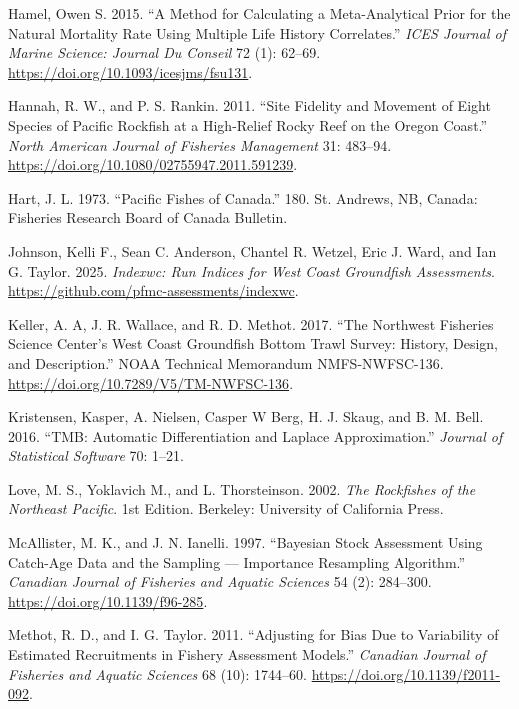 \documentclass[
]{scrartcl}
\newlength{\cslhangindent}
\newenvironment{CSLReferences}[2] %
 {\begin{list}{}{%
  \setlength{\itemindent}{0pt}
  \setlength{\leftmargin}{0pt}
  \setlength{\parsep}{0pt}
  \ifodd #1
   \setlength{\leftmargin}{\cslhangindent}
   \setlength{\itemindent}{-1\cslhangindent}
  \fi
  \setlength{\itemsep}{#2\baselineskip}}}
 {\end{list}}
\begin{document}
\begin{CSLReferences}{1}{0}
Hamel, Owen S. 2015. {``A Method for Calculating a Meta-Analytical Prior
for the Natural Mortality Rate Using Multiple Life History
Correlates.''} \emph{ICES Journal of Marine Science: Journal Du Conseil}
72 (1): 62--69. \url{https://doi.org/10.1093/icesjms/fsu131}.

Hannah, R. W., and P. S. Rankin. 2011. {``Site Fidelity and Movement of
Eight Species of Pacific Rockfish at a High-Relief Rocky Reef on the
Oregon Coast.''} \emph{North American Journal of Fisheries Management}
31: 483--94. \url{https://doi.org/10.1080/02755947.2011.591239}.

Hart, J. L. 1973. {``Pacific Fishes of Canada.''} 180. St. Andrews, NB,
Canada: Fisheries Research Board of Canada Bulletin.

Johnson, Kelli F., Sean C. Anderson, Chantel R. Wetzel, Eric J. Ward,
and Ian G. Taylor. 2025. \emph{Indexwc: Run Indices for West Coast
Groundfish Assessments}.
\url{https://github.com/pfmc-assessments/indexwc}.

Keller, A. A, J. R. Wallace, and R. D. Methot. 2017. {``The Northwest
Fisheries Science Center's West Coast Groundfish Bottom Trawl Survey:
History, Design, and Description.''} NOAA Technical Memorandum
NMFS-NWFSC-136. \url{https://doi.org/10.7289/V5/TM-NWFSC-136}.

Kristensen, Kasper, A. Nielsen, Casper W Berg, H. J. Skaug, and B. M.
Bell. 2016. {``{TMB}: {Automatic} {Differentiation} and {Laplace}
{Approximation}.''} \emph{Journal of Statistical Software} 70: 1--21.

Love, M. S., Yoklavich M., and L. Thorsteinson. 2002. \emph{The
{Rockfishes} of the {Northeast} {Pacific}}. 1st Edition. Berkeley:
University of California Press.

McAllister, M. K., and J. N. Ianelli. 1997. {``Bayesian Stock Assessment
Using Catch-Age Data and the Sampling --- Importance Resampling
Algorithm.''} \emph{Canadian Journal of Fisheries and Aquatic Sciences}
54 (2): 284--300. \url{https://doi.org/10.1139/f96-285}.

Methot, R. D., and I. G. Taylor. 2011. {``Adjusting for Bias Due to
Variability of Estimated Recruitments in Fishery Assessment Models.''}
\emph{Canadian Journal of Fisheries and Aquatic Sciences} 68 (10):
1744--60. \url{https://doi.org/10.1139/f2011-092}.


\end{CSLReferences}
\end{document}

